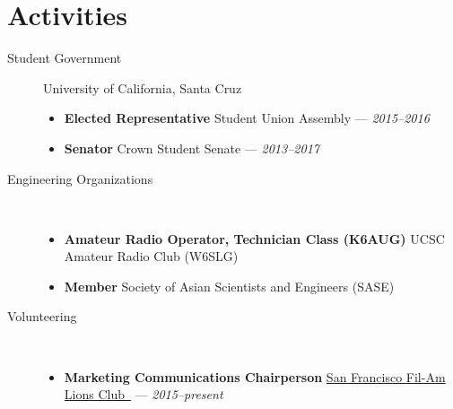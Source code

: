 \documentclass[10pt]{article}
\let\orighref\href
\renewcommand{\href}[2]{\orighref{#1}{#2{\scriptsize~\color{darkgray}\faExternalLink}}}
\begin{document}
\section*{Activities}
\begin{description}
  \item[Student Government] University of California, Santa Cruz
    \begin{itemize}
      \item \textbf{Elected Representative} Student Union Assembly --- \textit{2015--2016}
      \item \textbf{Senator} Crown Student Senate --- \textit{2013--2017}
    \end{itemize}
  \item[Engineering Organizations] ~
    \begin{itemize}
      \item \textbf{Amateur Radio Operator, Technician Class (K6AUG)} UCSC Amateur Radio Club (W6SLG)
      \item \textbf{Member} Society of Asian Scientists and Engineers (SASE)
    \end{itemize}
  \item[Volunteering] ~
    \begin{itemize}
      \item \textbf{Marketing Communications Chairperson}
        \href{http://SFFilAmLions.org}{San Francisco Fil-Am Lions Club} --- \textit{2015--present}
    \end{itemize}

\end{description}
\begin{comment}
\item[Relevant Hobbies] ~
  \begin{itemize}
    \item \textbf{\href{https://coord.info/PR62PFW}{Geocaching (4U6U57)}} 350
      finds
    \item \textbf{Pokemon Go} Team Instinct, Level 21
    \item \textbf{Ingress} Enlightened, Level 5
    \item \textbf{Google Maps Contributor/Local Guide} Level 5, formerly Google
      Maps Maker with 500+ edits
  \end{itemize}
\end{comment}
\end{document}
